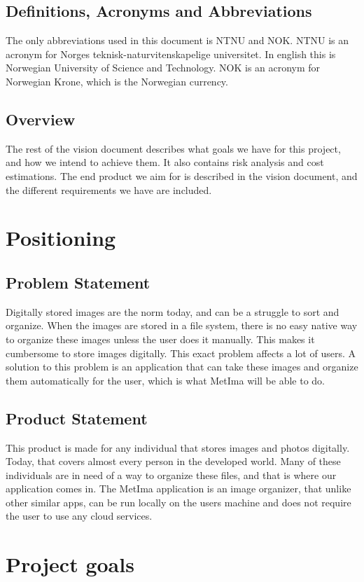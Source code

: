 \documentclass{article}
\begin{document}
\subsection{Definitions, Acronyms and Abbreviations}
The only abbreviations used in this document is NTNU and NOK. NTNU is an acronym for Norges teknisk-naturvitenskapelige universitet. In english this is Norwegian University of Science and Technology. NOK is an acronym for Norwegian Krone, which is the Norwegian currency.
\subsection{Overview}
The rest of the vision document describes what goals we have for this project, and how we intend to achieve them. It also contains risk analysis and cost estimations. The end product we aim for is described in the vision document, and the different requirements we have are included.

\section{Positioning}
\subsection{Problem Statement}
Digitally stored images are the norm today, and can be a struggle to sort and organize. When the images are stored in a file system, there is no easy native way to organize these images unless the user does it manually. This makes it cumbersome to store images digitally. This exact problem affects a lot of users. A solution to this problem is an application that can take these images and organize them automatically for the user, which is what MetIma will be able to do. 
\subsection{Product Statement}
This product is made for any individual that stores images and photos digitally. Today, that covers almost every person in the developed world. Many of these individuals are in need of a way to organize these files, and that is where our application comes in. The MetIma application is an image organizer, that unlike other similar apps, can be run locally on the users machine and does not require the user to use any cloud services.

\section{Project goals}
\end{document}
